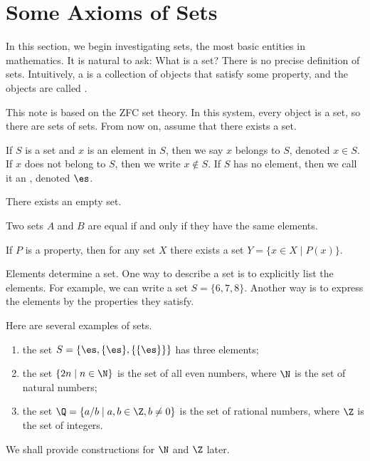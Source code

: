 \documentclass[10pt]{article}
\begin{document}
\section{Some Axioms of Sets}
\par
In this section, we begin investigating sets, the most basic entities in mathematics. It is natural to ask: What is a set? There is no precise definition of sets. Intuitively, a  is a collection of objects that satisfy some property, and the objects are called .
\begin{remark}
    This note is based on the ZFC set theory. In this system, every object is a set, so there are sets of sets. From now on, assume that there exists a set.
\end{remark}
\par
If $S$ is a set and $x$ is an element in $S$, then we say $x$ belongs to $S$, denoted $x\in S$. If $x$ does not belong to $S$, then we write $x\notin S$. If $S$ has no element, then we call it an , denoted $\es$.
\begin{Axiom of empty set}
    There exists an empty set.
\end{Axiom of empty set}
\begin{Axiom of extensionality}
    Two sets $A$ and $B$ are equal if and only if they have the same elements.
\end{Axiom of extensionality}
\begin{Axiom schema of separation}
    If $P$ is a property, then for any set $X$ there exists a set $Y=\{x\in X\mid P(x)\}$.
\end{Axiom schema of separation}
\par
Elements determine a set. One way to describe a set is to explicitly list the elements. For example, we can write a set $S=\{6,7,8\}$. Another way is to express the elements by the properties they satisfy.
\begin{example}
    Here are several examples of sets.
    \begin{enumerate}
        \item the set $S=\{\es,\{\es\},\{\{\es\}\}\}$ has three elements;
        \item the set $\{2n\mid n\in\N\}$ is the set of all even numbers, where $\N$ is the set of natural numbers;
        \item the set $\Q=\{a/b\mid a,b\in\Z,b\ne 0\}$ is the set of rational numbers, where $\Z$ is the set of integers.
    \end{enumerate}
    We shall provide constructions for $\N$ and $\Z$ later.
\end{example}
\end{document}
